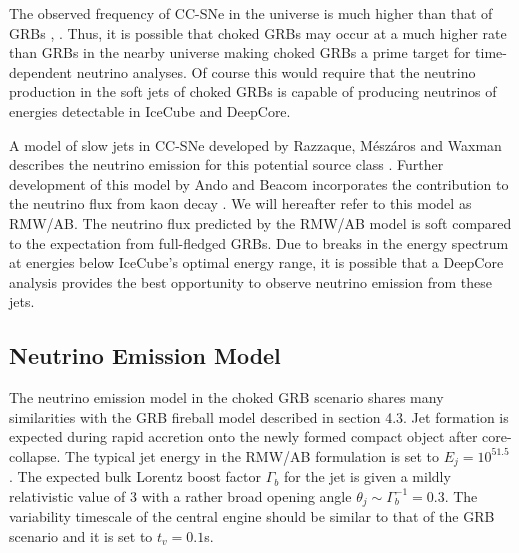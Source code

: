\documentclass{gatech-thesis}
\begin{document}
The observed frequency of CC-SNe in the universe is much higher than that of GRBs \cite{0004-637X-738-2-154}, \cite{2004RvMP...76.1143P}. Thus, it is possible that choked GRBs may occur at a much higher rate than GRBs in the nearby universe making choked GRBs a prime target for time-dependent neutrino analyses. Of course this would require that the neutrino production in the soft jets of choked GRBs is capable of producing neutrinos of energies detectable in IceCube and DeepCore.

A model of slow jets in CC-SNe developed by Razzaque, M\'{e}sz\'{a}ros and Waxman describes the neutrino emission for this potential source class \cite{2004PhRvL..93r1101R}. Further development of this model by Ando and Beacom incorporates the contribution to the neutrino flux from kaon decay \cite{2005PhRvL..95f1103A}. We will hereafter refer to this model as RMW/AB. The neutrino flux predicted by the RMW/AB model is soft compared to the expectation from full-fledged GRBs. Due to breaks in the energy spectrum at energies below IceCube's optimal energy range, it is possible that a DeepCore analysis provides the best opportunity to observe neutrino emission from these jets.

\subsection{Neutrino Emission Model}
The neutrino emission model in the choked GRB scenario shares many similarities with the GRB fireball model described in section 4.3. Jet formation is expected during rapid accretion onto the newly formed compact object after core-collapse. The typical jet energy in the RMW/AB formulation is set to $E_j=10^{51.5}$. The expected bulk Lorentz boost factor $\Gamma_b$ for the jet is given a mildly relativistic value of 3 with a rather broad opening angle $\theta_j \sim \Gamma_b^{-1}=0.3$. The variability timescale of the  central engine should be similar to that of the GRB scenario and it is set to $t_v = 0.1$s.
\end{document}

